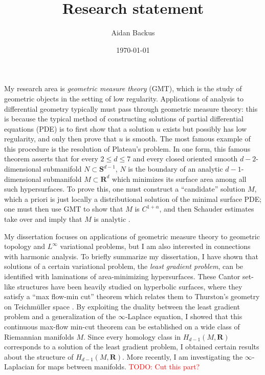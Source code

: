 \documentclass[reqno,11pt]{amsart}
\title{Research statement}
\author{Aidan Backus}
\date{\today}
\newcommand{\RR}{\mathbf{R}}
\newcommand{\Sph}{\mathbf S}
\newcommand{\dfn}[1]{\emph{#1}\index{#1}}
\theoremstyle{definition}
\numberwithin{equation}{section}
\newcommand\todo[1]{\textcolor{red}{TODO: #1}}
\begin{document}
\maketitle

My research area is \dfn{geometric measure theory} (GMT), which is the study of geometric objects in the setting of low regularity.
Applications of analysis to differential geometry typically must pass through geometric measure theory: this is because the typical method of constructing solutions of partial differential equations (PDE) is to first show that a solution $u$ exists but possibly has low regularity, and only then prove that $u$ is smooth.
The most famous example of this procedure is the resolution of Plateau's problem.
In one form, this famous theorem asserts that for every $2 \leq d \leq 7$ and every closed oriented smooth $d - 2$-dimensional submanifold $N \subset \Sph^{d - 1}$, $N$ is the boundary of an analytic $d - 1$-dimensional submanifold $M \subset \RR^d$ which minimizes its surface area among all such hypersurfaces.
To prove this, one must construct a ``candidate'' solution $M$, which a priori is just locally a distributional solution of the minimal surface PDE; one must then use GMT to show that $M$ is $C^{1 + \alpha}$, and then Schauder estimates take over and imply that $M$ is analytic \cite{Giusti77}.

My dissertation focuses on applications of geometric measure theory to geometric topology and $L^\infty$ variational problems, but I am also interested in connections with harmonic analysis.
To briefly summarize my dissertation, I have shown that solutions of a certain variational problem, the \dfn{least gradient problem}, can be identified with laminations of area-minimizing hypersurfaces.
These Cantor set-like structures have been heavily studied on hyperbolic surfaces, where they satisfy a ``max flow-min cut'' theorem which relates them to Thurston's geometry on Teichm\"uller space \cite{thurston1998minimal}.
By exploiting the duality between the least gradient problem and a generalization of the $\infty$-Laplace equation, I showed that this continuous max-flow min-cut theorem can be established on a wide class of Riemannian manifolds $M$.
Since every homology class in $H_{d - 1}(M, \RR)$ corresponds to a solution of the least gradient problem, I obtained certain results about the structure of $H_{d - 1}(M, \RR)$.
More recently, I am investigating the $\infty$-Laplacian for maps between manifolds.
\todo{Cut this part?}
\end{document}
